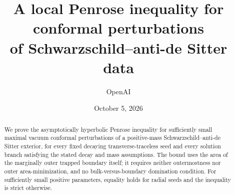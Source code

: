 \documentclass[11pt,a4paper]{article}
\title{A local Penrose inequality for conformal perturbations\\
of Schwarzschild--anti-de Sitter data}
\author{OpenAI}
\date{October 5, 2026}
\numberwithin{equation}{section}
\theoremstyle{definition}
\begin{document}
\maketitle
\begin{abstract}
We prove the asymptotically hyperbolic Penrose inequality for sufficiently
small maximal vacuum conformal perturbations of a positive-mass
Schwarzschild--anti-de Sitter exterior, for every fixed decaying
transverse-traceless seed and every solution branch satisfying the stated
decay and mass assumptions. The bound uses the area of the marginally
outer trapped boundary itself; it requires neither outermostness nor
outer area-minimization, and no bulk-versus-boundary domination condition.
For sufficiently small positive parameters, equality holds for radial
seeds and the inequality is strict otherwise.
\end{abstract}
\tableofcontents
\clearpage







\clearpage


\end{document}
